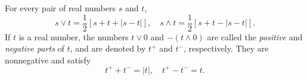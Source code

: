 For every pair of real numbers $s$ and $t$,
$$s \vee t = \frac{1}{2}[s + t + |s - t|], \quad s \wedge t = \frac{1}{2}[s + t - |s - t|].$$
If $t$ is a real number, the numbers $t \vee 0$ and $-(t \wedge 0)$ are called the \textit{positive} and \textit{negative parts} of $t$, and are denoted by $t^+$ and $t^-$, respectively. They are nonnegative and satisfy
$$t^+ + t^- = |t|, \quad t^+ - t^- = t.$$
